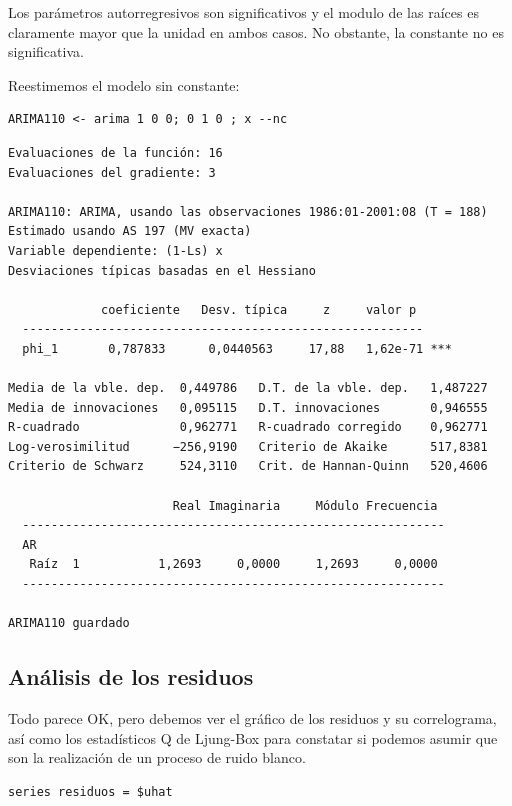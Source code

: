 \documentclass[10pt]{article}
\begin{document}
Los parámetros autorregresivos son significativos y el modulo de las
raíces es claramente mayor que la unidad en ambos casos. No obstante,
la constante no es significativa. 

Reestimemos el modelo sin constante:

\begin{verbatim}
ARIMA110 <- arima 1 0 0; 0 1 0 ; x --nc
\end{verbatim}

\begin{verbatim}
Evaluaciones de la función: 16
Evaluaciones del gradiente: 3

ARIMA110: ARIMA, usando las observaciones 1986:01-2001:08 (T = 188)
Estimado usando AS 197 (MV exacta)
Variable dependiente: (1-Ls) x
Desviaciones típicas basadas en el Hessiano

             coeficiente   Desv. típica     z     valor p 
  --------------------------------------------------------
  phi_1       0,787833      0,0440563     17,88   1,62e-71 ***

Media de la vble. dep.  0,449786   D.T. de la vble. dep.   1,487227
Media de innovaciones   0,095115   D.T. innovaciones       0,946555
R-cuadrado              0,962771   R-cuadrado corregido    0,962771
Log-verosimilitud      −256,9190   Criterio de Akaike      517,8381
Criterio de Schwarz     524,3110   Crit. de Hannan-Quinn   520,4606

                       Real Imaginaria     Módulo Frecuencia
  -----------------------------------------------------------
  AR
   Raíz  1           1,2693     0,0000     1,2693     0,0000
  -----------------------------------------------------------

ARIMA110 guardado
\end{verbatim}
\subsection*{Análisis de los residuos}
\label{sec:org8bdf6ae}

Todo parece OK, pero debemos ver el gráfico de los residuos y su
correlograma, así como los estadísticos Q de Ljung-Box para constatar
si podemos asumir que son la realización de un proceso de ruido
blanco.

\begin{verbatim}
series residuos = $uhat
\end{verbatim}
\end{document}
